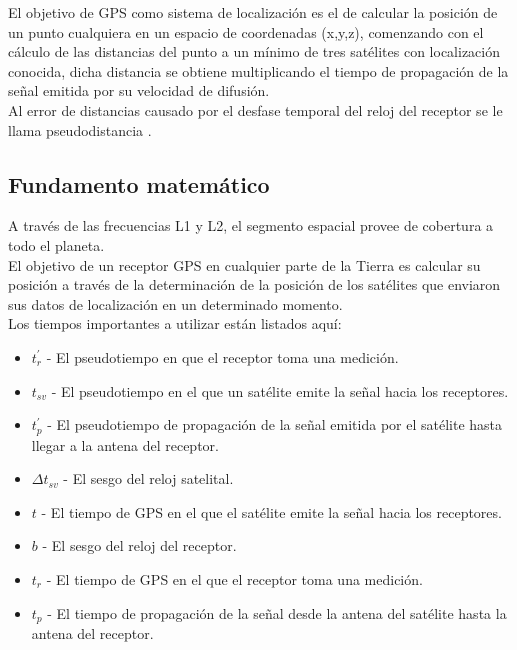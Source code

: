 El objetivo de GPS como sistema de localización es el de calcular la posición de un punto cualquiera en un espacio de coordenadas (x,y,z)\cite{sonnenberg2013radar}, comenzando con el cálculo de las distancias del punto a un mínimo de tres satélites con localización conocida, dicha distancia se obtiene multiplicando el tiempo de propagación de la señal emitida por su velocidad de difusión.\\

Al error de distancias causado por el desfase temporal del reloj del receptor se le llama pseudodistancia \cite{pozo2000sistema}.


\subsection{Fundamento matemático}

A través de las frecuencias L1 y L2, el segmento espacial provee de cobertura a todo el planeta.\\

El objetivo de un receptor GPS en cualquier parte de la Tierra es calcular su posición a través de la determinación de la posición de los satélites que enviaron sus datos de localización en un determinado momento.\\

Los tiempos importantes a utilizar están listados aquí:

\begin{itemize}
\item $t^{'}_r$ - El pseudotiempo en que el receptor toma una medición.\\
\item $t_{sv}$ - El pseudotiempo en el que un satélite emite la señal hacia los receptores.\\
\item $t^{'}_p$ - El pseudotiempo de propagación de la señal emitida por el satélite hasta llegar a la antena del receptor.\\
\item $\Delta t_{sv}$ - El sesgo del reloj satelital.\\
\item $t$ - El tiempo de GPS en el que el satélite emite la señal hacia los receptores.\\
\item $b$ - El sesgo del reloj del receptor.\\
\item $t_r$ - El tiempo de GPS en el que el receptor toma una medición.\\
\item $t_p$ - El tiempo de propagación de la señal desde la antena del satélite hasta la antena del receptor.
\end{itemize}

